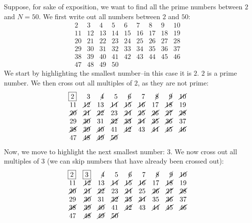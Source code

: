 Suppose, for sake of exposition, we want to find all the prime numbers between $2$ and $N = 50$. We first write out all numbers between $2$ and $50$:
\[
\begin{array}{rrrrrrrrr}
2 & 3 & 4 & 5 & 6 & 7 & 8 & 9 & 10 \\
11 & 12 & 13 & 14 & 15 & 16 & 17 & 18 & 19 \\
20 & 21 & 22 & 23 & 24 & 25 & 26 & 27 & 28 \\
29 & 30 & 31 & 32 & 33 & 34 & 35 & 36 & 37 \\
38 & 39 & 40 & 41 & 42 & 43 & 44 & 45 & 46 \\
47 & 48 & 49 & 50
\end{array}
\]
We start by highlighting the smallest number--in this case it is $2$. $2$ is a prime number. We then cross out all multiples of $2$, as they are not prime:
\[
\begin{array}{rrrrrrrrr}
\boxed{2} & 3 & \cancel{4} & 5 & \cancel{6} & 7 & \cancel{8} &
\cancel{9} & \cancel{10} \\
11 & \cancel{12} & 13 & \cancel{14} & \cancel{15} & \cancel{16} &
17 & \cancel{18} & 19 \\
\cancel{20} & \cancel{21} & \cancel{22} & 23 & \cancel{24} &
\cancel{25} & \cancel{26} & \cancel{27} & \cancel{28} \\
29 & \cancel{30} & 31 & \cancel{32} & \cancel{33} & \cancel{34} &
\cancel{35} & \cancel{36} & 37 \\
\cancel{38} & \cancel{39} & \cancel{40} & 41 & \cancel{42} &
43 & \cancel{44} & \cancel{45} & \cancel{46} \\
47 & \cancel{48} & \cancel{49} & \cancel{50}
\end{array}
\]
Now, we move to highlight the next smallest number: $3$. We now cross out all multiples of $3$ (we can skip numbers that have already been crossed out):
\[
\begin{array}{rrrrrrrrr}
\boxed{2} & \boxed{3} & \cancel{4} & 5 & \cancel{6} & 7 &
\cancel{8} & \cancel{9} & \cancel{10} \\
11 & \cancel{12} & 13 & \cancel{14} & \cancel{15} & \cancel{16} &
17 & \cancel{18} & 19 \\
\cancel{20} & \cancel{21} & \cancel{22} & 23 & \cancel{24} &
25 & \cancel{26} & \cancel{27} & \cancel{28} \\
29 & \cancel{30} & 31 & \cancel{32} & \cancel{33} & \cancel{34} &
35 & \cancel{36} & 37 \\
\cancel{38} & \cancel{39} & \cancel{40} & 41 & \cancel{42} &
43 & \cancel{44} & \cancel{45} & \cancel{46} \\
47 & \cancel{48} & \cancel{49} & \cancel{50}
\end{array}
\]
